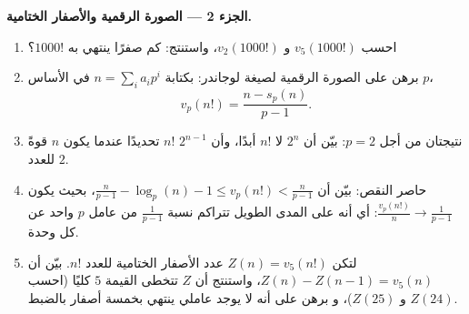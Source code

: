 \begin{problem}
\medskip
\noindent\textbf{الجزء 2 --- الصورة الرقمية والأصفار
الختامية.}
\begin{enumerate}[resume]
  \item احسب $v_5(1000!)$ و $v_2(1000!)$، واستنتج: كم
        صفرًا ينتهي به $1000!$؟
  \item برهن على الصورة الرقمية لصيغة لوجاندر: بكتابة $n =
        \sum_i a_i p^i$ في الأساس $p$،
        \[
        v_p(n!) = \frac{n - s_p(n)}{p - 1} .
        \]
  \item نتيجتان من أجل $p = 2$: بيّن أن $2^n$ لا  $n!$
        أبدًا، وأن $2^{n-1}$  $n!$ تحديدًا عندما يكون
        $n$ قوةً للعدد $2$.
  \item حاصر النقص: بيّن أن $\frac n{p-1} - \log_p(n) - 1 \leq
        v_p(n!) < \frac n{p-1}$، بحيث يكون $\frac{v_p(n!)}{n} \to
        \frac1{p-1}$: أي أنه على المدى الطويل تتراكم نسبة
        $\frac1{p-1}$ من عامل $p$ واحد عن كل وحدة.
  \item لتكن $Z(n) = v_5(n!)$ عدد الأصفار الختامية للعدد
        $n!$. بيّن أن $Z(n) - Z(n-1) = v_5(n)$، واستنتج أن $Z$ تتخطى
        القيمة $5$ كليًا (احسب $Z(24)$ و $Z(25)$)، و
        برهن على أنه لا يوجد عاملي ينتهي بخمسة أصفار بالضبط.
\end{enumerate}


\end{problem}
